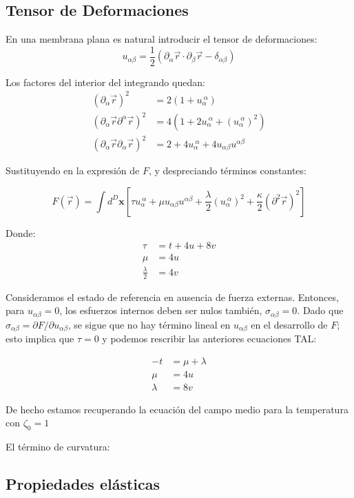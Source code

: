 \subsection{Tensor de Deformaciones}

En una membrana plana es natural introducir el tensor de deformaciones:
\begin{equation}
u_{\alpha\beta}=\frac{1}{2}(\partial_{\alpha}\vec{r}\cdot\partial_{\beta}\vec{r}-\delta_{\alpha\beta})
\end{equation}

Los factores del interior del integrando quedan:
\begin{align}
(\partial_{\alpha}\vec{r})^2&=2(1+u_{\alpha}^{\ \alpha})\\
(\partial_{\alpha}\vec{r}\partial^{\alpha}\vec{r})^2&=4(1+2u_{\alpha}^{\
  \alpha}+(u_{\alpha}^{\ \alpha})^2)\\
(\partial_{\alpha}\vec{r}\partial_{\alpha}\vec{r})^2&=2+4u_{\alpha}^{\
  \alpha}+4u_{\alpha\beta}u^{\alpha\beta}
\end{align}

Sustituyendo en la expresión de $F$, y despreciando términos constantes:

\begin{equation}
F(\vec{r})=\int d^D\mathbf{x}
\left[\tau u_{\alpha}^{\ \alpha}+
\mu u_{\alpha\beta}u^{\alpha\beta} +
\frac{\lambda}{2}(u_{\alpha}^{\ \alpha})^2 +
\frac{\kappa}{2}(\partial^2\vec{r})^2\right]
\end{equation}

Donde:
\begin{align}
\tau&=t+4u+8v\\
\mu&=4u\\
\frac{\lambda}{2}&=4v
\end{align}

Consideramos el estado de referencia en ausencia de fuerza externas. Entonces,
para $u_{\alpha\beta}=0$, los esfuerzos internos deben ser nulos también,
$\sigma_{\alpha\beta}=0$. Dado que $\sigma_{\alpha\beta}=\partial F / \partial
u_{\alpha\beta}$, se sigue que no hay término lineal en $u_{\alpha\beta}$ en
el desarrollo de $F$; esto implica que $\tau=0$ y podemos rescribir las
anteriores ecuaciones TAL:

\begin{align}
-t&=\mu+\lambda\\
\mu&=4u\\
\lambda&=8v
\end{align}   

De hecho estamos recuperando la ecuación del campo medio para la temperatura
con $\zeta_0=1$

El término de curvatura:

\subsection{Propiedades elásticas}
